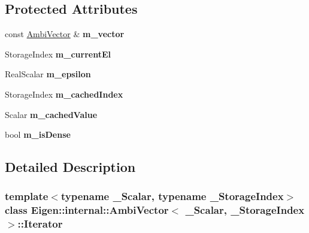 \subsection*{Protected Attributes}
\begin{DoxyCompactItemize}
\item 
\mbox{\label{class_eigen_1_1internal_1_1_ambi_vector_1_1_iterator_a71598fd5614d5a700f943c1c2df37d07}} 
const \mbox{\hyperlink{class_eigen_1_1internal_1_1_ambi_vector}{Ambi\+Vector}} \& {\bfseries m\+\_\+vector}
\item 
\mbox{\label{class_eigen_1_1internal_1_1_ambi_vector_1_1_iterator_ac830f5372f90d74d9fde178e92da4a94}} 
Storage\+Index {\bfseries m\+\_\+current\+El}
\item 
\mbox{\label{class_eigen_1_1internal_1_1_ambi_vector_1_1_iterator_ae1b2966ffa93413df690dfe6351bab79}} 
Real\+Scalar {\bfseries m\+\_\+epsilon}
\item 
\mbox{\label{class_eigen_1_1internal_1_1_ambi_vector_1_1_iterator_a234f49172c6f1540bbc5799ef7928d05}} 
Storage\+Index {\bfseries m\+\_\+cached\+Index}
\item 
\mbox{\label{class_eigen_1_1internal_1_1_ambi_vector_1_1_iterator_a1acd30f0d40f023eaf16e85e46ab1f14}} 
Scalar {\bfseries m\+\_\+cached\+Value}
\item 
\mbox{\label{class_eigen_1_1internal_1_1_ambi_vector_1_1_iterator_a49a8f2a6ad0822711f974524f73835fa}} 
bool {\bfseries m\+\_\+is\+Dense}
\end{DoxyCompactItemize}


\subsection{Detailed Description}
\subsubsection*{template$<$typename \+\_\+\+Scalar, typename \+\_\+\+Storage\+Index$>$\newline
class Eigen\+::internal\+::\+Ambi\+Vector$<$ \+\_\+\+Scalar, \+\_\+\+Storage\+Index $>$\+::\+Iterator}

